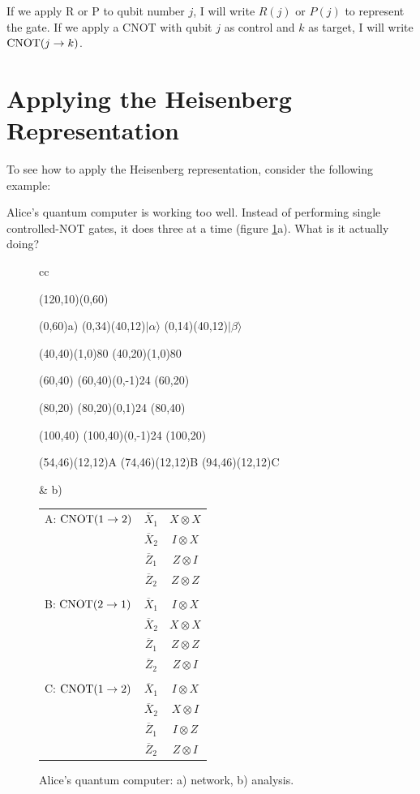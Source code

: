 If we apply R or P to qubit number $j$, I will write $R(j)$ or $P(j)$
to represent the gate.  If we apply a CNOT with qubit $j$ as control
and $k$ as target, I will write ${\rm CNOT}(j \rightarrow k)$.

\section{Applying the Heisenberg Representation}

To see how to apply the Heisenberg representation, consider the
following example:

\begin{example}
Alice's quantum computer is working too well.  Instead of performing
single controlled-NOT gates, it does three at a time (figure
\ref{fig:swap}a).  What is it actually doing?
\end{example}
\begin{figure}
\centering
\begin{tabular}{cc}
\begin{picture}(120,10)(0,60)

\put(0,60){a)}
\put(0,34){\makebox(40,12){$|\alpha\rangle$}}
\put(0,14){\makebox(40,12){$|\beta\rangle$}}

\put(40,40){\line(1,0){80}}
\put(40,20){\line(1,0){80}}

\put(60,40){}
\put(60,40){\line(0,-1){24}}
\put(60,20){}

\put(80,20){}
\put(80,20){\line(0,1){24}}
\put(80,40){}

\put(100,40){}
\put(100,40){\line(0,-1){24}}
\put(100,20){}

\put(54,46){\makebox(12,12){A}}
\put(74,46){\makebox(12,12){B}}
\put(94,46){\makebox(12,12){C}}

\end{picture}
&
b) \begin{tabular}[t]{lcc}
A: ${\rm CNOT}(1 \rightarrow 2)$ & $\overline{X}_1$ & $X \otimes X$ \\
& $\overline{X}_2$ & $I \otimes X$ \\
& $\overline{Z}_1$ & $Z \otimes I$ \\
& $\overline{Z}_2$ & $Z \otimes Z$ \\
\\
B: ${\rm CNOT}(2 \rightarrow 1)$ & $\overline{X}_1$ & $I \otimes X$ \\
& $\overline{X}_2$ & $X \otimes X$ \\
& $\overline{Z}_1$ & $Z \otimes Z$ \\
& $\overline{Z}_2$ & $Z \otimes I$ \\
\\
C: ${\rm CNOT}(1 \rightarrow 2)$ & $\overline{X}_1$ & $I \otimes X$ \\
& $\overline{X}_2$ & $X \otimes I$ \\
& $\overline{Z}_1$ & $I \otimes Z$ \\
& $\overline{Z}_2$ & $Z \otimes I$
\end{tabular}
\end{tabular}
\caption{Alice's quantum computer: a) network, b) analysis.}
\label{fig:swap}
\end{figure}

